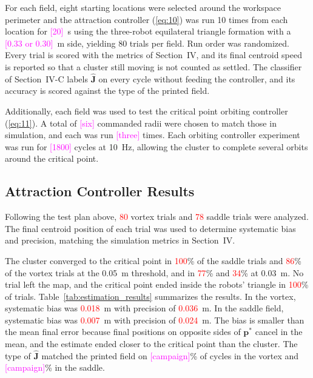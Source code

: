 \documentclass[lettersize,journal]{IEEEtran}
\newcommand{\syn}[1]{\textcolor{red}{#1}}            %
\newcommand{\open}[1]{\textcolor{magenta}{[#1]}}     %
\begin{document}
For each field, eight starting locations were selected around the workspace perimeter and the attraction controller (\ref{eq:10}) was run 10 times from each location for \open{20}~s using the three-robot equilateral triangle formation with a \open{0.33 or 0.30}~m side, yielding 80 trials per field. Run order was randomized. Every trial is scored with the metrics of Section~IV, and its final centroid speed is reported so that a cluster still moving is not counted as settled. The classifier of Section~IV-C labels $\hat{\mathbf{J}}$ on every cycle without feeding the controller, and its accuracy is scored against the type of the printed field. %

Additionally, each field was used to test the critical point orbiting controller (\ref{eq:11}). A total of \open{six} commanded radii were chosen to match those in simulation, and each was run \open{three} times. Each orbiting controller experiment was run for \open{1800} cycles at 10~Hz, allowing the cluster to complete several orbits around the critical point. %

 \subsection{Attraction Controller Results}

Following the test plan above, \syn{80} vortex trials and \syn{78} saddle trials were analyzed. The final centroid position of each trial was used to determine systematic bias and precision, matching the simulation metrics in Section~IV. %

The cluster converged to the critical point in \syn{100}\% of the saddle trials and \syn{86}\% of the vortex trials at the 0.05~m threshold, and in \syn{77}\% and \syn{34}\% at 0.03~m. No trial left the map, and the critical point ended inside the robots' triangle in \syn{100}\% of trials. Table~\ref{tab:estimation_results} summarizes the results. In the vortex, systematic bias was \syn{0.018}~m with precision of \syn{0.036}~m. In the saddle field, systematic bias was \syn{0.007}~m with precision of \syn{0.024}~m. The bias is smaller than the mean final error because final positions on opposite sides of $\mathbf{p}^*$ cancel in the mean, and the estimate ended closer to the critical point than the cluster. The type of $\hat{\mathbf{J}}$ matched the printed field on \open{campaign}\% of cycles in the vortex and \open{campaign}\% in the saddle. %
\end{document}

